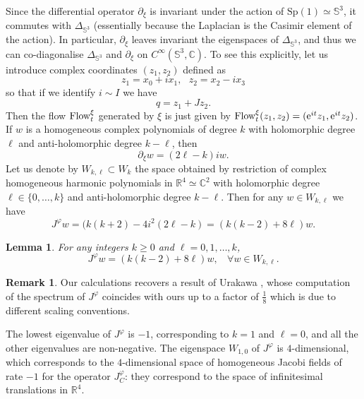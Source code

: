 \documentclass{article}
\numberwithin{equation}{section}        %
\theoremstyle{bfnote}
\newtheorem{lem}[thm]{Lemma}                %
\theoremstyle{definition}
\theoremstyle{bfremark}
\newtheorem{rem}[thm]{Remark}               %
\newcommand{\R}{\mathbb{R}}                 %
\newcommand{\C}{\mathbb{C}}                 %
\newcommand{\Sp}{\mathbb{S}}                %
\begin{document}
Since the differential operator $\partial_\xi$ is invariant under the action of $\mathrm{Sp}(1) \simeq \Sp^3$, it commutes with $\Delta_{\mathbb{S}^3}$ (essentially because the Laplacian is the Casimir element of the action). In particular, $\partial_\xi$ leaves invariant the eigenspaces of $\Delta_{\mathbb{S}^3}$, and thus we can co-diagonalise $\Delta_{\mathbb{S}^3}$ and $\partial_\xi$ on $C^\infty(\Sp^3,\C)$. To see this explicitly, let us introduce complex coordinates $(z_1,z_2)$ defined as
\begin{equation*}
    z_1 = x_0 + i x_1, ~~~ z_2 = x_2 - ix_3
\end{equation*}
so that if we identify $i \sim I$ we have
\begin{equation*}
    q = z_1 + J z_2 .
\end{equation*}
Then the flow $\textup{Flow}_{t}^\xi$ generated by $\xi$ is just given by $\textup{Flow}_{t}^\xi(z_1,z_2) = (\mathrm{e}^{it}z_1,\mathrm{e}^{it}z_2)$. If $w$ is a homogeneous complex polynomials of degree $k$ with holomorphic degree $\ell$ and anti-holomorphic degree $k-\ell$, then
\begin{equation*}
    \partial_\xi w = (2\ell - k)i w.
\end{equation*}
Let us denote by $W_{k,\ell} \subset W_k$ the space obtained by restriction of complex homogeneous harmonic polynomials in $\R^4 \simeq \C^2$ with holomorphic degree $\ell \in \{0,\ldots,k\}$ and anti-holomorphic degree $k-\ell$. Then for any $w \in W_{k,\ell}$ we have
\begin{equation*}
    J^\varphi w = (k(k+2) - 4 i^2 (2\ell-k) = (k(k-2) + 8 \ell) w .
\end{equation*}

\begin{lem}
    For any integers $k \geq 0$ and $\ell = 0, 1, \ldots, k$,
    \begin{equation*}
        J^\varphi w = (k(k-2) + 8\ell) w, ~~~~ \forall w \in W_{k,\ell}.
    \end{equation*}
\end{lem}

\begin{rem}
    Our calculations recovers a result of Urakawa \cite{urakawa1987stability}, whose computation of the spectrum of $J^\varphi$ coincides with ours up to a factor of $\tfrac{1}{8}$ which is due to different scaling conventions.
\end{rem}

The lowest eigenvalue of $J^\varphi$ is $-1$, corresponding to $k = 1$ and $\ell=0$, and all the other eigenvalues are non-negative. The eigenspace $W_{1,0}$ of $J^\varphi$ is $4$-dimensional, which corresponds to the $4$-dimensional space of homogeneous Jacobi fields of rate $-1$ for the operator $J^\varphi_C$: they correspond to the space of infinitesimal translations in $\R^4$.
\end{document}
